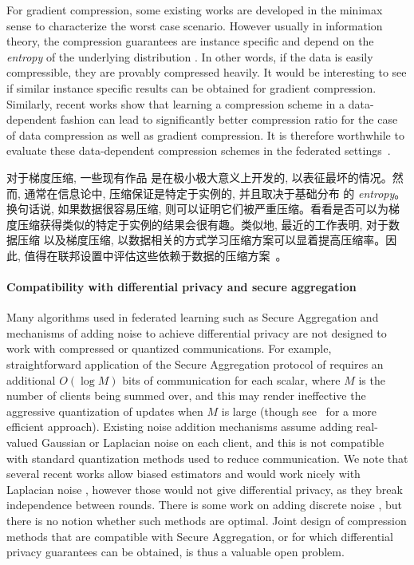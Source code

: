 For gradient compression, some existing works \cite{suresh2017distributed} are developed in the minimax sense to characterize the worst case scenario. However usually in information theory, the compression guarantees are instance specific and depend on the \emph{entropy} of the underlying distribution \cite{cover2012elements}. In other words, if the data is easily compressible, they are provably compressed heavily. It would be interesting to see if similar instance specific results can be obtained for gradient compression. Similarly, recent works show that learning a compression scheme in a data-dependent fashion can lead to significantly better compression ratio for the case of data compression \cite{wu2017multiscale} as well as gradient compression. It is therefore worthwhile to evaluate these data-dependent compression schemes in the federated settings~\cite{gandikota2019vqsgd}.


对于梯度压缩, 一些现有作品 \cite{suresh2017distributed} 是在极小极大意义上开发的, 以表征最坏的情况。然而, 通常在信息论中, 压缩保证是特定于实例的, 并且取决于基础分布 \cite{cover2012elements} 的 \emph{entropy}。换句话说, 如果数据很容易压缩, 则可以证明它们被严重压缩。看看是否可以为梯度压缩获得类似的特定于实例的结果会很有趣。类似地, 最近的工作表明, 对于数据压缩 \cite{wu2017multiscale} 以及梯度压缩, 以数据相关的方式学习压缩方案可以显着提高压缩率。因此, 值得在联邦设置中评估这些依赖于数据的压缩方案~\cite{gandikota2019vqsgd}。


\paragraph{Compatibility with differential privacy and secure aggregation} Many algorithms used in federated learning such as Secure Aggregation \citep{bonawitz2016practical} and mechanisms of adding noise to achieve differential privacy \citep{abadi2016deep,mcmahan18dplm} are not designed to work with compressed or quantized communications. For example, straightforward application of the Secure Aggregation protocol of \citet{bonawitz17secagg,bell20secagg} requires an additional $O(\log M)$ bits of communication for each scalar, where $M$ is the number of clients being summed over, and this may render ineffective the aggressive quantization of updates when $M$ is large (though see~\cite{bonawitz2019autotune} for a more efficient approach). Existing noise addition mechanisms assume adding real-valued Gaussian or Laplacian noise on each client, and this is not compatible with standard quantization methods used to reduce communication. We note that several recent works  allow biased estimators and would work nicely with Laplacian noise \cite{stich2019error}, however those would not give differential privacy, as they break independence between rounds. There is some work on adding discrete noise \cite{agarwal2018cpsgd}, but there is no notion whether such methods are optimal. Joint design of compression methods that are compatible with Secure Aggregation, or for which differential privacy guarantees can be obtained, is thus a valuable open problem.

